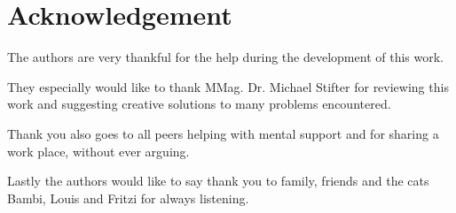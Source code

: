 \chapter{Acknowledgement}

The authors are very thankful for the help during the development of this work.


\vspace{5mm}
\noindent
They especially would like to thank MMag. Dr. Michael Stifter for reviewing this work and suggesting creative solutions to many problems encountered.

\vspace{5mm}
\noindent
Thank you also goes to all peers helping with mental support and for sharing a work place, without ever arguing.

\vspace{5mm}
\noindent
Lastly the authors would like to say thank you to family, friends and the cats Bambi, Louis and Fritzi for always listening.

